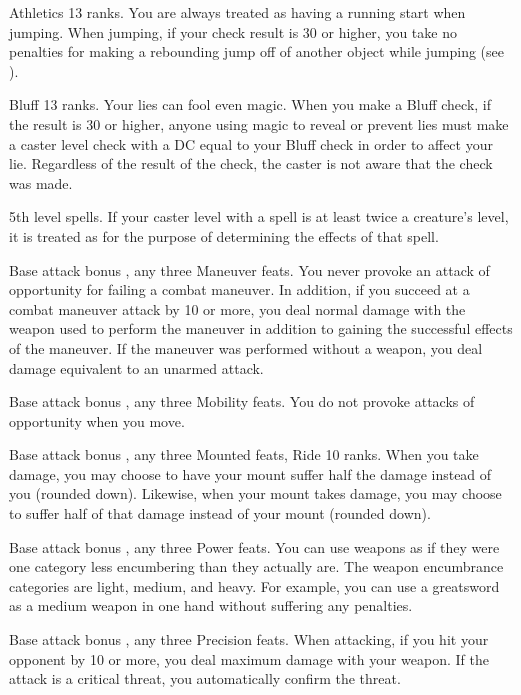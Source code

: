 \featpre Athletics 13 ranks.
\featben You are always treated as having a running start when jumping. When jumping, if your check result is 30 or higher, you take no penalties for making a rebounding jump off of another object while jumping (see ).

\featpre Bluff 13 ranks.
\featben Your lies can fool even magic. When you make a Bluff check, if the result is 30 or higher, anyone using magic to reveal or prevent lies must make a caster level check with a DC equal to your Bluff check in order to affect your lie. Regardless of the result of the check, the caster is not aware that the check was made.

\featpre 5th level spells.
\featben If your caster level with a spell is at least twice a creature's level, it is treated as \bloodied for the purpose of determining the effects of that spell.

\featpre Base attack bonus , any three Maneuver feats.
\featben You never provoke an attack of opportunity for failing a combat maneuver. In addition, if you succeed at a combat maneuver attack by 10 or more, you deal normal damage with the weapon used to perform the maneuver in addition to gaining the successful effects of the maneuver. If the maneuver was performed without a weapon, you deal damage equivalent to an unarmed attack.

\featpre Base attack bonus , any three Mobility feats.
\featben You do not provoke attacks of opportunity when you move.

\featpre Base attack bonus , any three Mounted feats, Ride 10 ranks.
\featben When you take damage, you may choose to have your mount suffer half the damage instead of you (rounded down). Likewise, when your mount takes damage, you may choose to suffer half of that damage instead of your mount (rounded down).

\featpres Base attack bonus , any three Power feats.
\featben You can use weapons as if they were one category less encumbering than they actually are. The weapon encumbrance categories are light, medium, and heavy. For example, you can use a greatsword as a medium weapon in one hand without suffering any penalties.

\featpre Base attack bonus , any three Precision feats.
\featben When attacking, if you hit your opponent by 10 or more, you deal maximum damage with your weapon. If the attack is a critical threat, you automatically confirm the threat.

